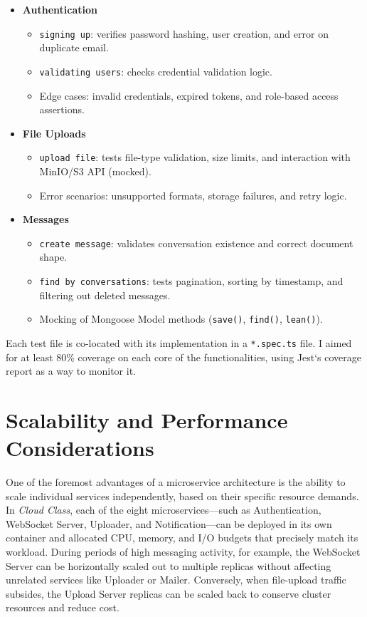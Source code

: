 \begin{itemize}
  \item \textbf{Authentication}
    \begin{itemize}
      \item \texttt{signing up}: verifies password hashing, user creation, and error on duplicate email.
      \item \texttt{validating users}: checks credential validation logic.
      \item Edge cases: invalid credentials, expired tokens, and role-based access assertions.
    \end{itemize}

  \item \textbf{File Uploads}
    \begin{itemize}
      \item \texttt{upload file}: tests file-type validation, size limits, and interaction with MinIO/S3 API (mocked).
      \item Error scenarios: unsupported formats, storage failures, and retry logic.
    \end{itemize}

  \item \textbf{Messages}
    \begin{itemize}
      \item \texttt{create message}: validates conversation existence and correct document shape.
      \item \texttt{find by conversations}: tests pagination, sorting by timestamp, and filtering out deleted messages.
      \item Mocking of Mongoose Model methods (\texttt{save()}, \texttt{find()}, \texttt{lean()}).
    \end{itemize}
\end{itemize}

Each test file is co-located with its implementation in a \texttt{*.spec.ts} file.  I aimed for at least 80\% coverage on each core of the functionalities, using Jest`s coverage report as a way to monitor it.

\section{Scalability and Performance Considerations}

One of the foremost advantages of a microservice architecture is the ability to scale individual services independently, based on their specific resource demands.  In \emph{Cloud Class}, each of the eight microservices—such as Authentication, WebSocket Server, Uploader, and Notification—can be deployed in its own container and allocated CPU, memory, and I/O budgets that precisely match its workload.  During periods of high messaging activity, for example, the WebSocket Server can be horizontally scaled out to multiple replicas without affecting unrelated services like Uploader or Mailer.  Conversely, when file-upload traffic subsides, the Upload Server replicas can be scaled back to conserve cluster resources and reduce cost.

